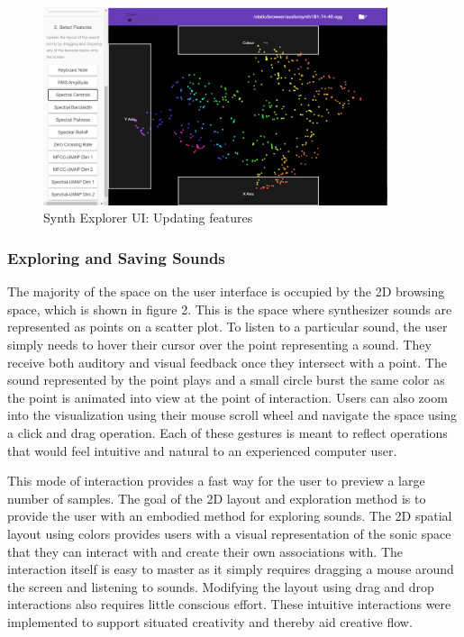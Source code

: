 \begin{figure}
    \centering
    \includegraphics[width=0.9\textwidth]{SynthExplore A.png}
    \caption{Synth Explorer UI: Updating features}
    \label{fig:features}
\end{figure}


\subsubsection{Exploring and Saving Sounds}
The majority of the space on the user interface is occupied by the 2D browsing space, which is shown in figure 2. This is the space where synthesizer sounds are represented as points on a scatter plot. To listen to a particular sound, the user simply needs to hover their cursor over the point representing a sound. They receive both auditory and visual feedback once they intersect with a point. The sound represented by the point plays and a small circle burst the same color as the point is animated into view at the point of interaction. Users can also zoom into the visualization using their mouse scroll wheel and navigate the space using a click and drag operation. Each of these gestures is meant to reflect operations that would feel intuitive and natural to an experienced computer user.

This mode of interaction provides a fast way for the user to preview a large number of samples. The goal of the 2D layout and exploration method is to provide the user with an embodied method for exploring sounds. The 2D spatial layout using colors provides users with a visual representation of the sonic space that they can interact with and create their own associations with. The interaction itself is easy to master as it simply requires dragging a mouse around the screen and listening to sounds. Modifying the layout using drag and drop interactions also requires little conscious effort. These intuitive interactions were implemented to support situated creativity and thereby aid creative flow.


